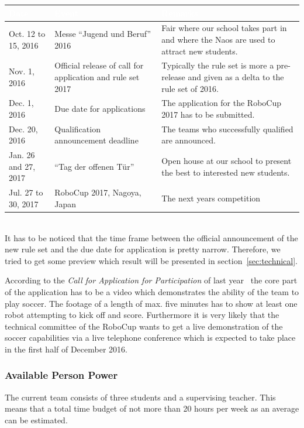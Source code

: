 \documentclass[12pt]{article}
\theoremstyle{definition}
\begin{document}
\begin{tabular}{|p{.16\linewidth}|p{.3\linewidth}|p{.38\linewidth}|}
\cellcolor[gray]{0.5}\textcolor{white}{Date} & \cellcolor[gray]{0.43}\textcolor{white}{Event} & \cellcolor[gray]{0.5}\textcolor{white}{Remarks} \\ \hline
Oct. 12 to 15, 2016 & Messe ``Jugend und Beruf'' 2016 & Fair where our school takes part in and where the Naos are used to attract new students. \\ \hline
Nov. 1, 2016 & Official release of call for application and rule set 2017 & Typically the rule set is more a pre-release and given as a delta to the rule set of 2016. \\ \hline
Dec. 1, 2016 & Due date for applications & The application for the RoboCup 2017 has to be submitted.\\ \hline
Dec. 20, 2016 & Qualification announcement deadline & The teams who successfully qualified are announced.\\ \hline
Jan. 26 and 27, 2017 & ``Tag der offenen Tür'' & Open house at our school to present the best to interested new students.\\ \hline
Jul. 27 to 30, 2017 & RoboCup 2017, Nagoya, Japan & The next years competition\\ \hline
\end{tabular}
\\

It has to be noticed that the time frame between the official announcement of the new rule set and the due date for application is pretty narrow. Therefore, we tried to get some preview which result will be presented in section~\ref{sec:technical}.

According to the {\em Call for Application for Participation} of last year~\cite{robocup_2016_standard_platform_league_call_2015} the core part of the application has to be a video which demonstrates the ability of the team to play soccer. The footage of a length of max. five minutes has to show at least one robot attempting to kick off and score. Furthermore it is very likely that the technical committee of the RoboCup wants to get a live demonstration of the soccer capabilities via a live telephone conference which is expected to take place in the first half of December 2016.

\subsubsection{Available Person Power}
The current team consists of three students and a supervising teacher. This means that a total time budget of not more than 20 hours per week as an average can be estimated.
\end{document}
